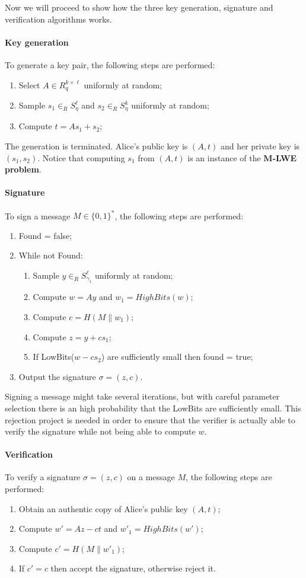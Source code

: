 \documentclass[binding=0.6cm,oneside,noexaminfo]{sapthesis}
\begin{document}
Now we will proceed to show how the three key generation, signature and verification algorithms works.

\paragraph{Key generation} To generate a key pair, the following steps are performed:
\begin{enumerate}
  \item Select $A\in R_q^{k\times \ell}$ uniformly at random;
  \item Sample $s_1\in_{R}S_{\eta}^{\ell}$ and $s_2\in_{R}S_{\eta}^{k}$ uniformly at random;
  \item Compute $t = As_1 + s_2$;
\end{enumerate}
The generation is terminated. Alice's public key is $(A, t)$ and her private key is $(s_1, s_2)$.
Notice that computing $s_1$ from $(A, t)$ is an instance of the \textbf{M-LWE problem}.

\paragraph{Signature}To sign a message $M \in \{0, 1\}^*$, the following steps are performed:
\begin{enumerate}
  \item Found = false;
  \item While not Found:
  \begin{enumerate}
    \item Sample $y\in_{R}S_{\gamma_1}^{\ell}$ uniformly at random;
    \item Compute $w = Ay$ and $w_1 = HighBits(w)$;
    \item Compute $c = H(M\|w_1)$;
    \item Compute $z = y + cs_1$;
    \item If LowBits($w - cs_2$) are sufficiently small then found = true;
    \end{enumerate}
  \item Output the signature $\sigma = (z, c)$.
\end{enumerate}
Signing a message might take several iterations, but with careful parameter selection
there is an high probability that the LowBits are sufficiently small.
This rejection project is needed in order to ensure that the verifier
is actually able to verify the signature while not being able to compute $w$.

\paragraph{Verification} To verify a signature $\sigma = (z, c)$ on a message $M$, the following steps are performed:
\begin{enumerate}
  \item Obtain an authentic copy of Alice's public key $(A, t)$;
  \item Compute $w' = Az - ct$ and $w'_1 = HighBits(w')$;
  \item Compute $c' = H(M\|w'_1)$;
  \item If $c' = c$ then accept the signature, otherwise reject it.
\end{enumerate}
\end{document}
